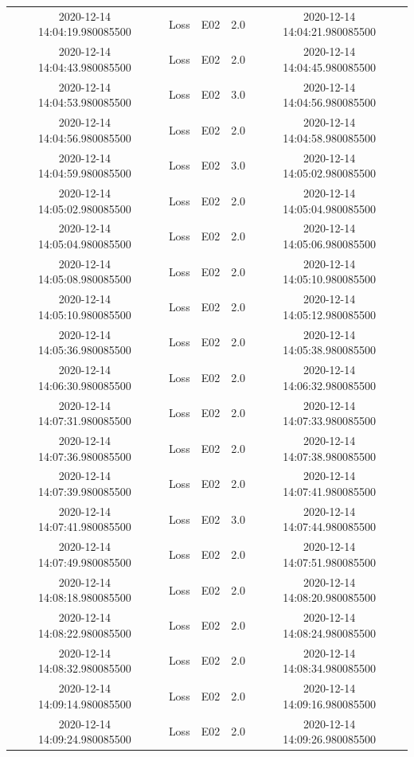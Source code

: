 \begin{enumerate}
\begin{longtabu}{ccccc}
2020{-}12{-}14 14:04:19.980085500&Loss&E02&2.0&2020{-}12{-}14 14:04:21.980085500\\%
2020{-}12{-}14 14:04:43.980085500&Loss&E02&2.0&2020{-}12{-}14 14:04:45.980085500\\%
2020{-}12{-}14 14:04:53.980085500&Loss&E02&3.0&2020{-}12{-}14 14:04:56.980085500\\%
2020{-}12{-}14 14:04:56.980085500&Loss&E02&2.0&2020{-}12{-}14 14:04:58.980085500\\%
2020{-}12{-}14 14:04:59.980085500&Loss&E02&3.0&2020{-}12{-}14 14:05:02.980085500\\%
2020{-}12{-}14 14:05:02.980085500&Loss&E02&2.0&2020{-}12{-}14 14:05:04.980085500\\%
2020{-}12{-}14 14:05:04.980085500&Loss&E02&2.0&2020{-}12{-}14 14:05:06.980085500\\%
2020{-}12{-}14 14:05:08.980085500&Loss&E02&2.0&2020{-}12{-}14 14:05:10.980085500\\%
2020{-}12{-}14 14:05:10.980085500&Loss&E02&2.0&2020{-}12{-}14 14:05:12.980085500\\%
2020{-}12{-}14 14:05:36.980085500&Loss&E02&2.0&2020{-}12{-}14 14:05:38.980085500\\%
2020{-}12{-}14 14:06:30.980085500&Loss&E02&2.0&2020{-}12{-}14 14:06:32.980085500\\%
2020{-}12{-}14 14:07:31.980085500&Loss&E02&2.0&2020{-}12{-}14 14:07:33.980085500\\%
2020{-}12{-}14 14:07:36.980085500&Loss&E02&2.0&2020{-}12{-}14 14:07:38.980085500\\%
2020{-}12{-}14 14:07:39.980085500&Loss&E02&2.0&2020{-}12{-}14 14:07:41.980085500\\%
2020{-}12{-}14 14:07:41.980085500&Loss&E02&3.0&2020{-}12{-}14 14:07:44.980085500\\%
2020{-}12{-}14 14:07:49.980085500&Loss&E02&2.0&2020{-}12{-}14 14:07:51.980085500\\%
2020{-}12{-}14 14:08:18.980085500&Loss&E02&2.0&2020{-}12{-}14 14:08:20.980085500\\%
2020{-}12{-}14 14:08:22.980085500&Loss&E02&2.0&2020{-}12{-}14 14:08:24.980085500\\%
2020{-}12{-}14 14:08:32.980085500&Loss&E02&2.0&2020{-}12{-}14 14:08:34.980085500\\%
2020{-}12{-}14 14:09:14.980085500&Loss&E02&2.0&2020{-}12{-}14 14:09:16.980085500\\%
2020{-}12{-}14 14:09:24.980085500&Loss&E02&2.0&2020{-}12{-}14 14:09:26.980085500\\%

\end{longtabu}
\end{enumerate}
